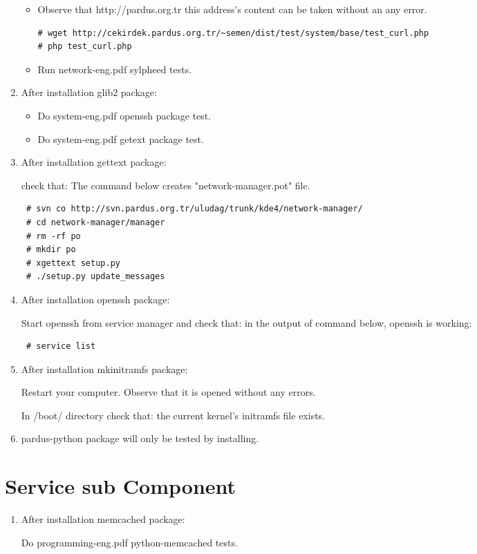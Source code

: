 \documentclass[a4paper,10pt]{article}
\begin{document}
\begin{enumerate}
\begin{itemize}
\item Observe that http://pardus.org.tr this address's content can be taken without an any error.
\begin{verbatim}
# wget http://cekirdek.pardus.org.tr/~semen/dist/test/system/base/test_curl.php
# php test_curl.php
\end{verbatim}

\item Run network-eng.pdf sylpheed tests.
\end{itemize}

\item After installation  glib2 package:
\begin{itemize}
 \item Do system-eng.pdf openssh package test.
\item Do system-eng.pdf getext package test.
\end{itemize}

\item After installation  gettext package:

check that: The command below creates "network-manager.pot" file.
\begin{verbatim}
 # svn co http://svn.pardus.org.tr/uludag/trunk/kde4/network-manager/
 # cd network-manager/manager
 # rm -rf po
 # mkdir po
 # xgettext setup.py 
 # ./setup.py update_messages
\end{verbatim}


\item After installation  openssh package:

Start openssh from service manager and check that: in the output of command below, openssh is working:
\begin{verbatim}
 # service list 
\end{verbatim}

\item After installation  mkinitramfs package:

Restart your computer. Observe that it is opened without any errors.

In /boot/ directory check that: the current kernel's initramfs file exists.

\item pardus-python package will only be tested by installing.

\end{enumerate}
\section{Service sub Component}
\begin{enumerate}
 \item After installation  memcached package:

  Do programming-eng.pdf python-memcached tests. 
\end{enumerate}
\end{document}
